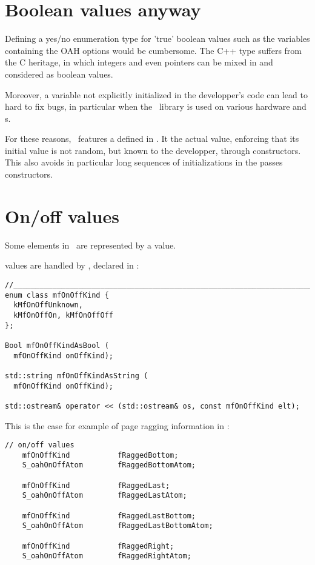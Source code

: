 \section{Boolean values anyway}

Defining a yes/no enumeration type for 'true' boolean values such as the variables containing the OAH options would be cumbersome. The C++  type suffers from the C heritage, in which integers and even pointers can be mixed in and considered as boolean values.

Moreover, a  variable not explicitly initialized in the developper's code can lead to hard to fix bugs, in particular when the \mf\ library is used on various hardware and \OS s.

For these reasons, \mf\ features a  defined in . It  the actual  value, enforcing that its initial value is not random, but known to the developper, through constructors. This also avoids in particular long sequences of initializations in the passes constructors.


\section{On/off values}

Some elements in \mf\ are represented by a  value.

\OnOff values are handled by , declared in :
\begin{lstlisting}[language=Terminal]
//______________________________________________________________________________
enum class mfOnOffKind {
  kMfOnOffUnknown,
  kMfOnOffOn, kMfOnOffOff
};

Bool mfOnOffKindAsBool (
  mfOnOffKind onOffKind);

std::string mfOnOffKindAsString (
  mfOnOffKind onOffKind);

std::ostream& operator << (std::ostream& os, const mfOnOffKind elt);
\end{lstlisting}

This is the case for example of page ragging information in :
\begin{lstlisting}[language=Terminal]
    // on/off values
    mfOnOffKind           fRaggedBottom;
    S_oahOnOffAtom        fRaggedBottomAtom;

    mfOnOffKind           fRaggedLast;
    S_oahOnOffAtom        fRaggedLastAtom;

    mfOnOffKind           fRaggedLastBottom;
    S_oahOnOffAtom        fRaggedLastBottomAtom;

    mfOnOffKind           fRaggedRight;
    S_oahOnOffAtom        fRaggedRightAtom;
\end{lstlisting}


